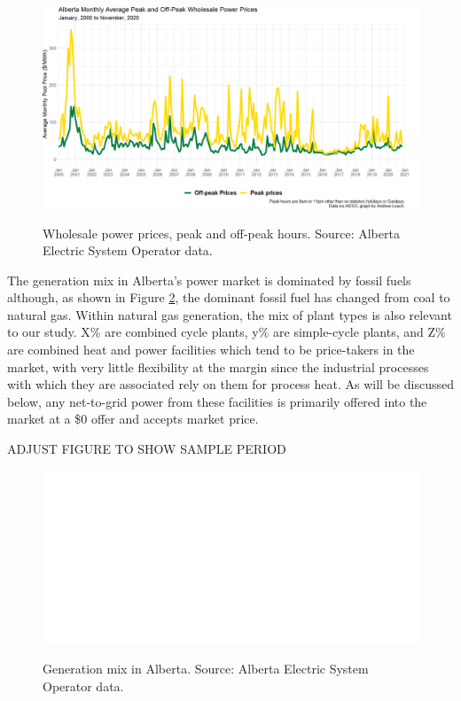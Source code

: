 \documentclass[12pt]{article}
\begin{document}
\begin{figure}[!h]%
	\centering \vspace{-.25cm} \includegraphics[width=6.5in]{../images/peak_prices_2000_2020.png}
\label{fig:ab_prices}
\vspace{-0.75cm}	\caption{Wholesale power prices, peak and off-peak hours.  Source: Alberta Electric System Operator data.}
\end{figure}

The generation mix in Alberta's power market is dominated by fossil fuels although, as shown in Figure \ref{fig:gen_mix}, the dominant fossil fuel has changed from coal to natural gas. Within natural gas generation, the mix of plant types is also relevant to our study. X\% are combined cycle plants, y\% are simple-cycle plants, and Z\% are combined heat and power facilities which tend to be price-takers in the market, with very little flexibility at the margin since the industrial processes with which they are associated rely on them for process heat. As will be discussed below, any net-to-grid power from these facilities is primarily offered into the market at a \$0 offer and accepts market price.


ADJUST FIGURE TO SHOW SAMPLE PERIOD


\begin{figure}[!h]%
	\centering \vspace{-.25cm} \includegraphics[width=6.5in]{../images/gen_fuel.png}
\label{fig:gen_mix}
\vspace{-0.75cm}	\caption{Generation mix in Alberta.  Source: Alberta Electric System Operator data.}
\end{figure}
\end{document}
